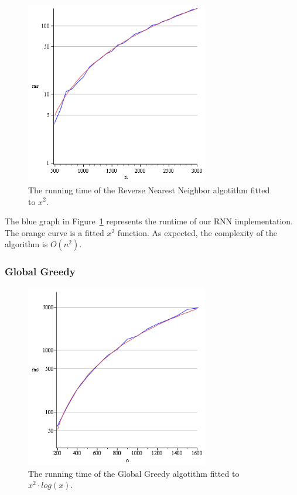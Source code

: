 \documentclass[a4paper,11pt]{article}
\begin{document}
\begin{figure}[ht!]
\centering 
\includegraphics[width=80mm]{RNN_runtime.png}
\caption{The running time of the Reverse Nearest Neighbor algotithm fitted to $x^2$.}
\label{rnn} 
\end{figure}

The blue graph in Figure~\ref{rnn} represents the runtime of our RNN implementation. The orange curve is a fitted $x^2$ function. As expected, the complexity of the algorithm is $O(n^{2})$.

\subsubsection{Global Greedy}

\begin{figure}[ht!]
\centering 
\includegraphics[width=80mm]{GG_runtime.png}
\caption{The running time of the Global Greedy algotithm fitted to $x^2 \cdot log(x)$.}
\label{gg} 
\end{figure}
\end{document}
